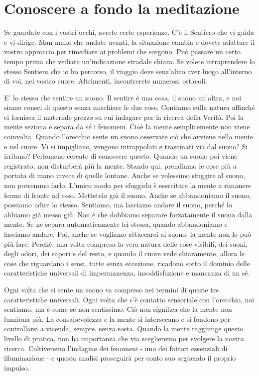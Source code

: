 \section{Conoscere a fondo la meditazione}

Se guardate con i vostri occhi, avrete certe esperienze. C'è il Sentiero
che vi guida e vi dirige. Man mano che andate avanti, la situazione
cambia e dovete adattare il vostro approccio per rimediare ai problemi
che sorgono. Può passare un certo tempo prima che vediate un'indicazione
stradale chiara. Se volete intraprendere lo stesso Sentiero che io ho
percorso, il viaggio deve senz'altro aver luogo all'interno di voi, nel
vostro cuore. Altrimenti, incontrerete numerosi ostacoli.

E' lo stesso che sentire un suono. Il sentire è una cosa, il suono
un'altra, e noi siamo consci di questo senza mischiare le due cose.
Contiamo sulla natura affinché ci fornisca il materiale grezzo su cui
indagare per la ricerca della Verità. Poi la mente seziona e separa da
sé i fenomeni. Cioè la mente semplicemente non viene coinvolta. Quando
l'orecchio sente un suono osservate ciò che avviene nella mente e nel
cuore. Vi si impigliano, vengono intrappolati e trascinati via dal
suono? Si irritano? Perlomeno cercate di conoscere questo. Quando un
suono poi viene registrato, non disturberà più la mente. Stando qui,
prendiamo le cose più a portata di mano invece di quelle lontane. Anche
se volessimo sfuggire al suono, non potremmo farlo. L'unico modo per
sfuggirlo è esercitare la mente a rimanere ferma di fronte ad esso.
Mettetelo giù il suono. Anche se abbandoniamo il suono, possiamo udire
lo stesso. Sentiamo, ma lasciamo andare il suono, perché lo abbiamo già
messo giù. Non è che dobbiamo separare forzatamente il suono dalla
mente. Se ne separa automaticamente lei stessa, quando abbandoniamo e
lasciamo andare. Poi, anche se vogliamo attaccarci al suono, la mente
non lo può più fare. Perché, una volta compresa la vera natura delle
cose visibili, dei suoni, degli odori, dei sapori e del resto, e quando
il cuore vede chiaramente, allora le cose che riguardano i sensi, tutte
senza eccezione, ricadono sotto il dominio delle caratteristiche
universali di impermanenza, insoddisfazione e mancanza di un sé.

Ogni volta che si sente un suono va compreso nei termini di queste tre
caratteristiche universali. Ogni volta che c'è contatto sensoriale con
l'orecchio, noi sentiamo, ma è come se non sentissimo. Ciò non significa
che la mente non funziona più. La consapevolezza e la mente si
intersecano e si fondono per controllarsi a vicenda, sempre, senza
sosta. Quando la mente raggiunge questo livello di pratica, non ha
importanza che via sceglieremo per svolgere la nostra ricerca.
Coltiveremo l'indagine dei fenomeni - uno dei fattori essenziali di
illuminazione - e questa analisi proseguirà per conto suo seguendo il
proprio impulso.

